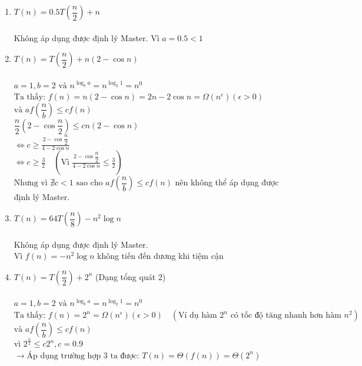 \documentclass[12pt, letterpaper]{article}
\begin{document}
\begin{enumerate}[label=\bfseries\large\theenumi.]
    \item $ T(n) = 0.5 T\left( \dfrac{n}{2} \right) + n $ \\ \\
        Không áp dụng được định lý Master. Vì $ a = 0.5 < 1 $ \\

    \item $ T(n) = T\left( \dfrac{n}{2} \right) + n(2 - \cos n) $ \\ \\
        $ a = 1, b = 2 \text{ và } n^{\log_b a} = n^{\log_2 1} = n^0 $ \\
        $ \text{Ta thấy: } f(n) = n (2 - \cos n) = 2n - 2 \cos n = \Omega(n^\epsilon) (\epsilon > 0) $ \\
        $ \text{và } af\left(\dfrac{n}{b}\right) \leq cf(n) $ \\
        $ \dfrac{n}{2} (2 - \cos \dfrac{n}{2}) \leq c n (2 - \cos n)$ \\
        $ \Leftrightarrow c \geq \frac{2 - \cos \dfrac{n}{2}}{4 - 2\cos n} $ \\
        $ \Leftrightarrow c \geq \frac{3}{2} \quad (\text{Vì } \frac{2 - \cos \dfrac{n}{2}}{4 - 2\cos n} \leq \frac{3}{2})$ \\
        $ \text{Nhưng vì } \nexists c < 1 \text{ sao cho } af\left(\dfrac{n}{b}\right) \leq cf(n) $
        nên không thể áp dụng được định lý Master.

    \item $ T(n) = 64T\left( \dfrac{n}{8} \right) - n^2 \log n $ \\ \\
        Không áp dụng được định lý Master. \\
        Vì $ f(n) = -n^2 \log n $ không tiến đến dương khi tiệm cận \\

    \item $ T(n) = T\left( \dfrac{n}{2} \right) + 2^n $ (Dạng tổng quát 2) \\ \\
        $ a = 1, b = 2 \text{ và } n^{\log_b a} = n^{\log_2 1} = n^0 $ \\
        $ \text{Ta thấy: } f(n) = 2^n = \Omega(n^\epsilon) (\epsilon > 0) \quad (\text{Ví dụ hàm $2^n$ có tốc độ tăng nhanh hơn hàm $n^2$})$ \\
        $ \text{và } af\left(\dfrac{n}{b}\right) \leq cf(n) $ \\
        $ \text{vì } 2^{\frac{n}{2}} \leq c 2^n, c = 0.9 $ \\
        $ \rightarrow \text{Áp dụng trường hợp 3 ta được: } T(n) = \Theta(f(n)) = \Theta(2^n) $


\end{enumerate}
\end{document}
